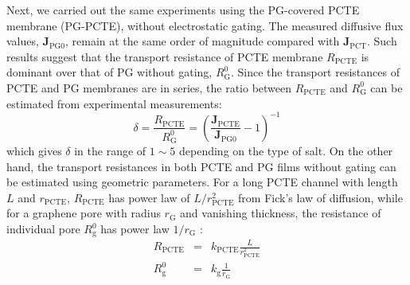 Next, we carried out the same experiments using the PG-covered PCTE
membrane (PG-PCTE), without electrostatic gating. The measured
diffusive flux values, $\symbf{J}_{\mathrm{PG0}}$, remain at the
same order of magnitude compared with $\mathbf{J}_{\mathrm{PCT}}$.
%
Such results suggest that the transport resistance of PCTE membrane
$R_{\mathrm{PCTE}}$ is dominant over that of PG without gating,
$R_{\mathrm{G}}^{0}$.
%
Since the transport resistances of PCTE and PG membranes are in
series, the ratio between $R_{\mathrm{PCTE}}$ and $R_{\mathrm{G}}^{0}$
can be estimated from experimental measurements:
\begin{equation}
  \label{eq:np-resist-ratio}
  \delta = \frac{R_{\mathrm{PCTE}}}{R_{\mathrm{G}}^{0}}
  = \left(\frac{\symbf{J}_{\mathrm{PCTE}}}{\symbf{J}_{\mathrm{PG0}}} -1 \right)^{-1}
\end{equation}%
  which gives $\delta$ in the range of $1\sim{}5$
depending on the type of salt.
%
On the other hand, the transport resistances in both PCTE and PG films without gating can be estimated using geometric parameters.
For a long PCTE channel with length $L$ and $r_{\mathrm{PCTE}}$,
$R_{\mathrm{PCTE}}$ has power law of $L/r_{\mathrm{PCTE}}^{2}$ from
Fick's law of diffusion, while for a graphene pore with radius
$r_{\mathrm{G}}$ and vanishing thickness, the resistance of individual
pore $R_{\mathrm{g}}^{0}$ has power law $1/r_{\mathrm{G}}$
\cite{O_Hern_2014}:
\begin{subequations}
\begin{eqnarray}
  \label{eq:np-R-both}
  R_{\mathrm{PCTE}} &= &k_{\mathrm{PCTE}} \frac{L}{r_{\mathrm{PCTE}}^{2}} \\
  R_{\mathrm{g}}^{0} &= &k_{\mathrm{g}} \frac{1}{r_{\mathrm{G}}}
\end{eqnarray}
\end{subequations}
